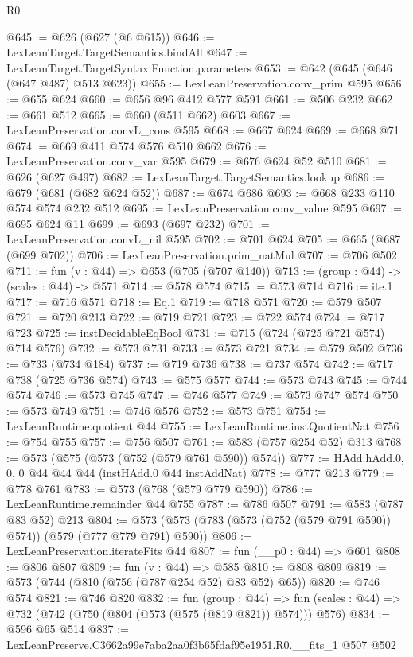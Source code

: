 \begin{lexlean}{R0}
\begin{coremodule}
@645 := @626 (@627 (@6 @615))
@646 := LexLeanTarget.TargetSemantics.bindAll
@647 := LexLeanTarget.TargetSyntax.Function.parameters
@653 := @642 (@645 (@646 (@647 @487) @513 @623))
@655 := LexLeanPreservation.conv_prim @595
@656 := @655 @624
@660 := @656 @96 @412 @577 @591
@661 := @506 @232
@662 := @661 @512
@665 := @660 (@511 @662) @603
@667 := LexLeanPreservation.convL_cons @595
@668 := @667 @624
@669 := @668 @71
@674 := @669 @411 @574 @576 @510 @662
@676 := LexLeanPreservation.conv_var @595
@679 := @676 @624 @52 @510
@681 := @626 (@627 @497)
@682 := LexLeanTarget.TargetSemantics.lookup
@686 := @679 (@681 (@682 @624 @52))
@687 := @674 @686
@693 := @668 @233 @110 @574 @574 @232 @512
@695 := LexLeanPreservation.conv_value @595
@697 := @695 @624 @11
@699 := @693 (@697 @232)
@701 := LexLeanPreservation.convL_nil @595
@702 := @701 @624
@705 := @665 (@687 (@699 @702))
@706 := LexLeanPreservation.prim_natMul
@707 := @706 @502
@711 := fun (v : @44) => @653 (@705 (@707 @140))
@713 := (group : @44) -> (scales : @44) -> @571
@714 := @578 @574
@715 := @573 @714
@716 := ite.{1}
@717 := @716 @571
@718 := Eq.{1}
@719 := @718 @571
@720 := @579 @507
@721 := @720 @213
@722 := @719 @721
@723 := @722 @574
@724 := @717 @723
@725 := instDecidableEqBool
@731 := @715 (@724 (@725 @721 @574) @714 @576)
@732 := @573 @731
@733 := @573 @721
@734 := @579 @502
@736 := @733 (@734 @184)
@737 := @719 @736
@738 := @737 @574
@742 := @717 @738 (@725 @736 @574)
@743 := @575 @577
@744 := @573 @743
@745 := @744 @574
@746 := @573 @745
@747 := @746 @577
@749 := @573 @747 @574
@750 := @573 @749
@751 := @746 @576
@752 := @573 @751
@754 := LexLeanRuntime.quotient @44
@755 := LexLeanRuntime.instQuotientNat
@756 := @754 @755
@757 := @756 @507
@761 := @583 (@757 @254 @52) @313
@768 := @573 (@575 (@573 (@752 (@579 @761 @590)) @574))
@777 := HAdd.hAdd.{0, 0, 0} @44 @44 @44 (instHAdd.{0} @44 instAddNat)
@778 := @777 @213
@779 := @778 @761
@783 := @573 (@768 (@579 @779 @590))
@786 := LexLeanRuntime.remainder @44 @755
@787 := @786 @507
@791 := @583 (@787 @83 @52) @213
@804 := @573 (@573 (@783 (@573 (@752 (@579 @791 @590)) @574)) (@579 (@777 @779 @791) @590))
@806 := LexLeanPreservation.iterateFits @44
@807 := fun (__p0 : @44) => @601
@808 := @806 @807
@809 := fun (v : @44) => @585
@810 := @808 @809
@819 := @573 (@744 (@810 (@756 (@787 @254 @52) @83 @52) @65))
@820 := @746 @574
@821 := @746 @820
@832 := fun (group : @44) =>
  fun (scales : @44) => @732 (@742 (@750 (@804 (@573 (@575 (@819 @821)) @574))) @576)
@834 := @596 @65 @514
@837 := LexLeanPreserve.C3662a99e7aba2aa0f3b65fdaf95e1951.R0.__fits_1 @507 @502

\end{coremodule}
\end{lexlean}

